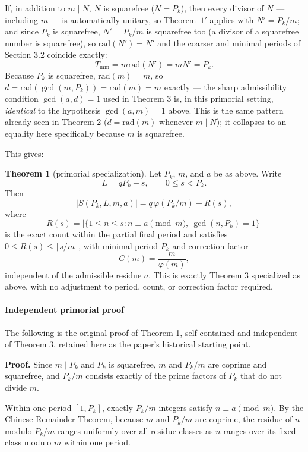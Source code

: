 \documentclass[
]{article}
\begin{document}
If, in addition to \(m\mid N\), \(N\) is squarefree (\(N=P_k\)), then
every divisor of \(N\) --- including \(m\) --- is automatically unitary,
so Theorem~\(1'\) applies with \(N'=P_k/m\); and since \(P_k\) is
squarefree, \(N'=P_k/m\) is squarefree too (a divisor of a squarefree
number is squarefree), so \(\mathrm{rad}(N')=N'\) and the coarser and
minimal periods of Section 3.2 coincide exactly: \[
T_{\min}=m\mathrm{rad}(N')=mN'=P_k.
\] Because \(P_k\) is squarefree, \(\mathrm{rad}(m)=m\), so
\(d=\mathrm{rad}(\gcd(m,P_k))=\mathrm{rad}(m)=m\) exactly --- the sharp
admissibility condition \(\gcd(a,d)=1\) used in Theorem 3 is, in this
primorial setting, \emph{identical} to the hypothesis \(\gcd(a,m)=1\)
above. This is the same pattern already seen in Theorem 2
(\(d=\mathrm{rad}(m)\) whenever \(m\mid N\)); it collapses to an
equality here specifically because \(m\) is squarefree.

This gives:

\textbf{Theorem 1} (primorial specialization). Let \(P_k\), \(m\), and
\(a\) be as above. Write \[
L = qP_k + s,\qquad 0\le s<P_k.
\] Then \[
|S(P_k,L,m,a)| = q\,\varphi(P_k/m) + R(s),
\] where \[
R(s) = \bigl|\{1\le n\le s : n\equiv a\pmod m,\ \gcd(n,P_k)=1\}\bigr|
\] is the exact count within the partial final period and satisfies
\(0\le R(s)\le\lceil s/m\rceil\), with minimal period \(P_k\) and
correction factor \[
C(m) = \frac{m}{\varphi(m)},
\] independent of the admissible residue \(a\). This is exactly Theorem
3 specialized as above, with no adjustment to period, count, or
correction factor required.

\paragraph{Independent primorial
proof}\label{independent-primorial-proof}

The following is the original proof of Theorem 1, self-contained and
independent of Theorem 3, retained here as the paper's historical
starting point.

\textbf{Proof.} Since \(m\mid P_k\) and \(P_k\) is squarefree, \(m\) and
\(P_k/m\) are coprime and squarefree, and \(P_k/m\) consists exactly of
the prime factors of \(P_k\) that do not divide \(m\).

Within one period \([1,P_k]\), exactly \(P_k/m\) integers satisfy
\(n\equiv a\pmod m\). By the Chinese Remainder Theorem, because \(m\)
and \(P_k/m\) are coprime, the residue of \(n\) modulo \(P_k/m\) ranges
uniformly over all residue classes as \(n\) ranges over its fixed class
modulo \(m\) within one period.
\end{document}
